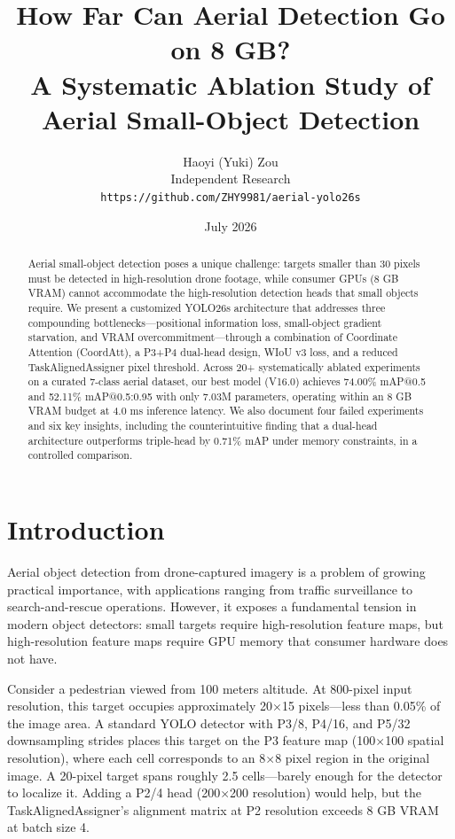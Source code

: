 \documentclass[11pt]{article}
\title{\textbf{How Far Can Aerial Detection Go on 8 GB?\\A Systematic Ablation Study of Aerial Small-Object Detection}}
\author{
    Haoyi (Yuki) Zou\\[2mm]
    \small Independent Research\\[1mm]
    \small \texttt{https://github.com/ZHY9981/aerial-yolo26s}
}
\date{July 2026}
\begin{document}
\maketitle

\begin{abstract}
Aerial small-object detection poses a unique challenge: targets smaller than 30 pixels must be
detected in high-resolution drone footage, while consumer GPUs (8 GB VRAM) cannot accommodate
the high-resolution detection heads that small objects require. We present a customized YOLO26s
architecture that addresses three compounding bottlenecks—positional information loss, small-object
gradient starvation, and VRAM overcommitment—through a combination of Coordinate Attention (CoordAtt),
a P3+P4 dual-head design, WIoU v3 loss, and a reduced TaskAlignedAssigner pixel threshold. Across
20+ systematically ablated experiments on a curated 7-class aerial dataset, our best model (V16.0)
achieves 74.00\% mAP@0.5 and 52.11\% mAP@0.5:0.95 with only 7.03M parameters, operating within
an 8 GB VRAM budget at 4.0 ms inference latency. We also document four failed experiments and six
key insights, including the counterintuitive finding that a dual-head architecture outperforms
triple-head by 0.71\% mAP under memory constraints, in a controlled comparison.
\end{abstract}

\section{Introduction}

Aerial object detection from drone-captured imagery is a problem of growing practical importance,
with applications ranging from traffic surveillance to search-and-rescue operations. However, it
exposes a fundamental tension in modern object detectors: small targets require high-resolution
feature maps, but high-resolution feature maps require GPU memory that consumer hardware does
not have.

Consider a pedestrian viewed from 100 meters altitude. At 800-pixel input resolution, this target
occupies approximately 20$\times$15 pixels—less than 0.05\% of the image area. A standard YOLO
detector with P3/8, P4/16, and P5/32 downsampling strides places this target on the P3 feature map
(100$\times$100 spatial resolution), where each cell corresponds to an 8$\times$8 pixel region in
the original image. A 20-pixel target spans roughly 2.5 cells—barely enough for the detector to
localize it. Adding a P2/4 head (200$\times$200 resolution) would help, but the TaskAlignedAssigner's
alignment matrix at P2 resolution exceeds 8 GB VRAM at batch size 4.
\end{document}
